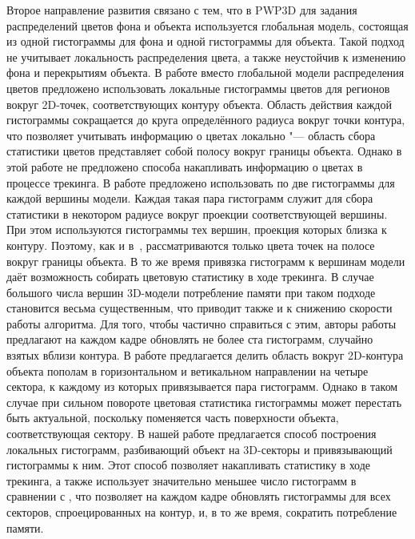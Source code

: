Второе направление развития связано с тем, что в PWP3D для задания
распределений цветов фона и объекта используется глобальная модель, состоящая
из одной гистограммы для фона и одной гистограммы для объекта.
Такой подход не учитывает локальность распределения цвета, а также неустойчив к
изменению фона и перекрытиям объекта.
В работе \cite{Hexner2016} вместо глобальной модели распределения цветов
предложено использовать локальные гистограммы цветов для регионов вокруг
2D-точек, соответствующих контуру объекта.
Область действия каждой гистограммы сокращается до круга определённого радиуса
вокруг точки контура, что позволяет учитывать информацию о цветах локально "---
область сбора статистики цветов представляет собой полосу вокруг границы
объекта.
Однако в этой работе не предложено способа накапливать информацию о цветах в
процессе трекинга.
В работе \cite{Tjaden2017} предложено использовать по две гистограммы для
каждой вершины модели.
Каждая такая пара гистограмм служит для сбора статистики в некотором радиусе
вокруг проекции соответствующей вершины.
При этом используются гистограммы тех вершин, проекция которых близка к
контуру.
Поэтому, как и в~\cite{Hexner2016}, рассматриваются только цвета точек на
полосе вокруг границы объекта.
В то же время привязка гистограмм к вершинам модели даёт возможность собирать
цветовую статистику в ходе трекинга.
В случае большого числа вершин 3D-модели потребление памяти при таком подходе
становится весьма существенным, что приводит также и к снижению скорости работы
алгоритма.
Для того, чтобы частично справиться с этим, авторы работы \cite{Tjaden2017}
предлагают на каждом кадре обновлять не более ста гистограмм, случайно взятых
вблизи контура.
В работе \cite{Zhong2018} предлагается делить  область вокруг 2D-контура
объекта пополам в горизонтальном и ветикальном направлении на четыре сектора,
к каждому из которых привязывается пара гистограмм.
Однако в таком случае при сильном повороте цветовая статистика гистограммы
может перестать быть актуальной, поскольку поменяется часть поверхности
объекта, соответствующая сектору.
В нашей работе предлагается способ построения локальных гистограмм, разбивающий
объект на 3D-секторы и привязывающий гистограммы к ним.
Этот способ позволяет накапливать статистику в ходе трекинга, а также использует
значительно меньшее число гистограмм в сравнении с \cite{Tjaden2017}, что
позволяет на каждом кадре обновлять гистограммы для всех секторов,
спроецированных на контур, и, в то же время, сократить потребление
памяти.

